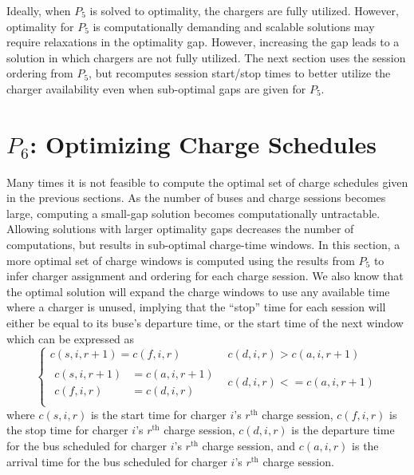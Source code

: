 \par Ideally, when $P_5$ is solved to optimality, the chargers are fully utilized. However, optimality for $P_5$ is computationally demanding and scalable solutions may require relaxations in the optimality gap.  However, increasing the gap leads to a solution in which chargers are not fully utilized. The next section uses the session ordering from $P_5$, but recomputes session start/stop times to better utilize the charger availability even when sub-optimal gaps are given for $P_5$.


\section{$P_6$: Optimizing Charge Schedules\label{sec:optimizingChargeSchedules}}
Many times it is not feasible to compute the optimal set of charge schedules given in the previous sections. As the number of buses and charge sessions becomes large, computing a small-gap solution becomes computationally untractable. Allowing solutions with larger optimality gaps decreases the number of computations, but results in sub-optimal charge-time windows.  In this section, a more optimal set of charge windows is computed using the results from $P_5$ to infer charger assignment and ordering for each charge session. We also know that the optimal solution will expand the charge windows to use any available time where a charger is unused, implying that the ``stop'' time for each session will either be equal to its buse's departure time, or the start time of the next window which can be expressed as
\begin{equation}\label{eqn:optChargeSchedules:eqn1}
\begin{cases}
	c(s,i,r+1) = c(f,i,r) & c(d,i,r) > c(a,i,r+1)\\[0.08in]
	\begin{aligned}
	c(s,i,r+1) &= c(a,i,r+1) \\
	c(f,i,r) &= c(d,i,r)
	\end{aligned} & c(d,i,r) <= c(a,i,r+1) \\
\end{cases}
\end{equation}
where $c(s,i,r)$ is the start time for charger $i$'s $r^{\text{th}}$ charge session, $c(f,i,r)$ is the stop time for charger $i$'s $r^{\text{th}}$ charge session, $c(d,i,r)$ is the departure time for the bus scheduled for charger $i$'s $r^{\text{th}}$ charge session, and $c(a,i,r)$ is the arrival time for the bus scheduled for charger $i$'s $r^{\text{th}}$ charge session. 
